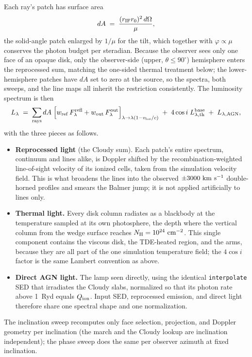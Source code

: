 \documentclass[11pt]{article}
\newcommand{\rIF}{r_{\rm IF}}
\begin{document}
Each ray's patch has surface area
\begin{equation}
dA \;=\; \frac{(\rIF r_0)^2\, d\Omega}{\mu},
\end{equation}
the solid-angle patch enlarged by $1/\mu$ for the tilt, which together
with $\varphi \propto \mu$ conserves the photon budget per steradian.
Because the observer sees only one face of an opaque disk, only the
observer-side (upper, $\theta \le 90^\circ$) hemisphere enters the
reprocessed sum, matching the one-sided thermal treatment below; the
lower-hemisphere patches have $dA$ set to zero at the source, so the
spectra, both sweeps, and the line maps all inherit the restriction
consistently.
The luminosity spectrum is then
\begin{equation}
L_\lambda \;=\; \sum_{\rm rays} dA \;
\Bigl[ w_{\rm ref}\, F^{\rm refl}_\lambda
     + w_{\rm out}\, F^{\rm out}_\lambda \Bigr]_{\lambda \to \lambda(1 - v_{\rm los}/c)}
\;+\; 4\cos i \; L^{\rm base}_{\lambda,\rm th} \;+\; L_{\lambda,\rm AGN},
\end{equation}
with the three pieces as follows.
\begin{itemize}
\item \textbf{Reprocessed light} (the Cloudy sum). Each patch's entire
      spectrum, continuum and lines alike, is Doppler shifted by the
      recombination-weighted line-of-sight velocity of its ionized
      cells, taken from the simulation velocity field. This is what
      broadens the lines into the observed $\pm3000~{\rm km~s^{-1}}$
      double-horned profiles and smears the Balmer jump; it is not
      applied artificially to lines only.
\item \textbf{Thermal light.} Every disk column radiates as a
      blackbody at the temperature sampled at its own photosphere,
      the depth where the vertical column from the wedge surface
      reaches $N_{\rm H} = 10^{24}~{\rm cm^{-2}}$. This single
      component contains the viscous disk, the TDE-heated region, and
      the arms, because they are all part of the one simulation
      temperature field; the $4\cos i$ factor is the same Lambert
      convention as above.
\item \textbf{Direct AGN light.} The lamp seen directly, using the
      identical \texttt{interpolate} SED that irradiates the Cloudy
      slabs, normalized so that its photon rate above 1~Ryd equals
      $Q_{\rm ion}$. Input SED, reprocessed emission, and direct light
      therefore share one spectral shape and one normalization.
\end{itemize}
The inclination sweep recomputes only face selection, projection, and
Doppler geometry per inclination (the march and the Cloudy lookup are
inclination independent); the phase sweep does the same per observer
azimuth at fixed inclination.
\end{document}

